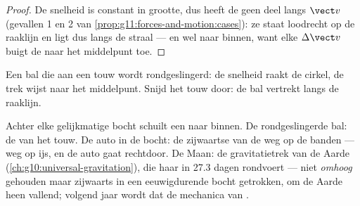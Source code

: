 \begin{proof}
De snelheid is constant in grootte, dus heeft de  geen
deel langs $\vect v$ (gevallen 1 en 2 van
\cref{prop:g11:forces-and-motion:cases}): ze staat loodrecht op de
raaklijn en ligt dus langs de straal --- en wel naar binnen, want elke
$\Delta \vect v$ buigt de  naar het middelpunt toe.
\end{proof}

\begin{omfigure}

{\small Een bal die aan een touw wordt rondgeslingerd: de snelheid raakt
de cirkel, de trek wijst naar het middelpunt. Snijd het touw door: de bal
vertrekt langs de raaklijn.}
\end{omfigure}

\begin{example}\label{ex:g11:forces-and-motion:moon}
Achter elke gelijkmatige bocht schuilt een  naar binnen. De
rondgeslingerde bal: de  van het touw. De auto in de bocht: de
zijwaartse  van de weg op de banden --- weg op ijs, en
de auto gaat rechtdoor. De Maan: de gravitatietrek van de Aarde
(\cref{ch:g10:universal-gravitation}), die haar in \num{27.3} dagen
rondvoert --- niet \emph{omhoog} gehouden maar zijwaarts in een
eeuwigdurende bocht getrokken, om de Aarde heen vallend; volgend jaar
wordt dat de mechanica van .
\end{example}

